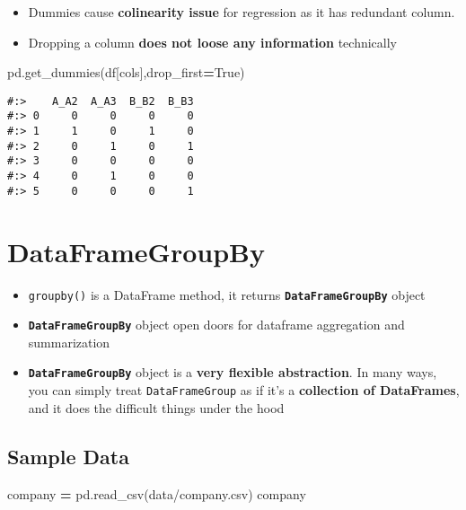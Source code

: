 \documentclass[
]{book}
\newenvironment{Shaded}{\begin{snugshade}}{\end{snugshade}}
\newcommand{\NormalTok}[1]{#1}
\newcommand{\OperatorTok}[1]{\textcolor[rgb]{0.43,0.43,0.43}{\textbf{#1}}}
\newcommand{\StringTok}[1]{\textcolor[rgb]{0.5,0.5,0.5}{#1}}
\newcommand{\VariableTok}[1]{\textcolor[rgb]{0,0,0}{#1}}
\providecommand{\tightlist}{%
  \setlength{\itemsep}{0pt}\setlength{\parskip}{0pt}}
\begin{document}
\begin{itemize}
\tightlist
\item
  Dummies cause \textbf{colinearity issue} for regression as it has redundant column.\\
\item
  Dropping a column \textbf{does not loose any information} technically
\end{itemize}

\begin{Shaded}
\begin{Highlighting}[]
\NormalTok{pd.get\_dummies(df[cols],drop\_first}\OperatorTok{=}\VariableTok{True}\NormalTok{)}
\end{Highlighting}
\end{Shaded}

\begin{verbatim}
#:>    A_A2  A_A3  B_B2  B_B3
#:> 0     0     0     0     0
#:> 1     1     0     1     0
#:> 2     0     1     0     1
#:> 3     0     0     0     0
#:> 4     0     1     0     0
#:> 5     0     0     0     1
\end{verbatim}

\hypertarget{dataframegroupby}{%
\section{DataFrameGroupBy}\label{dataframegroupby}}

\begin{itemize}
\tightlist
\item
  \texttt{groupby()} is a DataFrame method, it returns \textbf{\texttt{DataFrameGroupBy}} object\\
\item
  \textbf{\texttt{DataFrameGroupBy}} object open doors for dataframe aggregation and summarization\\
\item
  \textbf{\texttt{DataFrameGroupBy}} object is a \textbf{very flexible abstraction}. In many ways, you can simply treat \texttt{DataFrameGroup} as if it's a \textbf{collection of DataFrames}, and it does the difficult things under the hood
\end{itemize}

\hypertarget{sample-data-14}{%
\subsection{Sample Data}\label{sample-data-14}}

\begin{Shaded}
\begin{Highlighting}[]
\NormalTok{company }\OperatorTok{=}\NormalTok{ pd.read\_csv(}\StringTok{\textquotesingle{}data/company.csv\textquotesingle{}}\NormalTok{)}
\NormalTok{company}
\end{Highlighting}
\end{Shaded}
\end{document}
